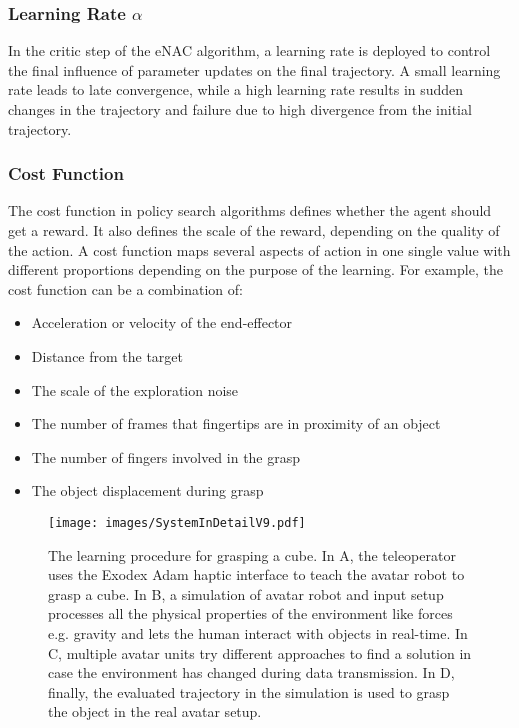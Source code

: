 \documentclass[letterpaper, 10 pt, conference]{ieeeconf}  %
\begin{document}
\subsubsection{Learning Rate $\alpha$}
In the critic step of the eNAC algorithm, a learning rate is deployed to control the final influence of parameter updates on the final trajectory. A small learning rate leads to late convergence, while a high learning rate results in sudden changes in the trajectory and failure due to high divergence from the initial trajectory.  
\subsubsection{Cost Function}
The cost function in policy search algorithms defines whether the agent should get a reward. It also defines the scale of the reward, depending on the quality of the action. A cost function maps several aspects of action in one single value with different proportions depending on the purpose of the learning. For example, the cost function can be a combination of:
\begin{itemize}
    \item Acceleration or velocity of the end-effector
    \item Distance from the target
    \item The scale of the exploration noise
    \item The number of frames that fingertips are in proximity of an object
    \item The number of fingers involved in the grasp
    \item The object displacement during grasp
\end{itemize}   
\begin{figure*}
\centering
\texttt{[image: images/SystemInDetailV9.pdf]}
    \caption{The learning procedure for grasping a cube. In A, the teleoperator uses the Exodex Adam haptic interface to teach the avatar robot to grasp a cube. In B, a simulation of avatar robot and input setup processes all the physical properties of the environment like forces e.g. gravity and lets the human interact with objects in real-time. In C, multiple avatar units try different approaches to find a solution in case the environment has changed during data transmission. In D, finally, the evaluated trajectory in the simulation is used to grasp the object in the real avatar setup.}
    \vspace{-6mm}
    \label{fig:SystemInReal}
\end{figure*}
\end{document}
